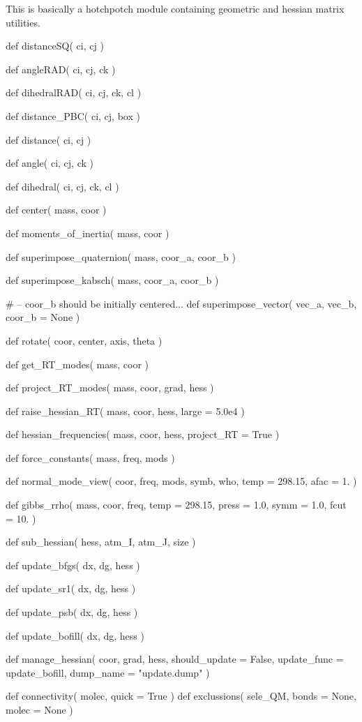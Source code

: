 \normalsize
This is basically a hotchpotch module containing geometric and hessian matrix utilities. 
\begin{pyglist}[language=python,fvset={frame=single}]
def distanceSQ( ci, cj )

def angleRAD( ci, cj, ck )

def dihedralRAD( ci, cj, ck, cl )

def distance_PBC( ci, cj, box )

def distance( ci, cj )

def angle( ci, cj, ck )

def dihedral( ci, cj, ck, cl )

def center( mass, coor )

def moments_of_inertia( mass, coor )

def superimpose_quaternion( mass, coor_a, coor_b )

def superimpose_kabsch( mass, coor_a, coor_b )

# -- coor_b should be initially centered...
def superimpose_vector( vec_a, vec_b, coor_b = None )

def rotate( coor, center, axis, theta )

def get_RT_modes( mass, coor )

def project_RT_modes( mass, coor, grad, hess )

def raise_hessian_RT( mass, coor, hess, large = 5.0e4 )

def hessian_frequencies( mass, coor, hess, project_RT = True )

def force_constants( mass, freq, mods )

def normal_mode_view( coor, freq, mods, symb, who, temp = 298.15, afac = 1. )

def gibbs_rrho( mass, coor, freq, temp = 298.15, press = 1.0, symm = 1.0, fcut = 10. )

def sub_hessian( hess, atm_I, atm_J, size )

def update_bfgs( dx, dg, hess )

def update_sr1( dx, dg, hess )

def update_psb( dx, dg, hess )

def update_bofill( dx, dg, hess )

def manage_hessian( coor, grad, hess, should_update = False, update_func = update_bofill,
    dump_name = "update.dump" )

def connectivity( molec, quick = True )
def exclussions( sele_QM, bonds = None, molec = None )
\end{pyglist}
